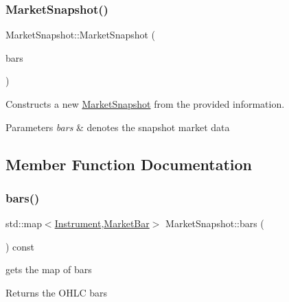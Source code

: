 \mbox{\label{classMarketSnapshot_a5e1530204818ffaea1e479d9371e77ae}} 
\subsubsection{\texorpdfstring{Market\+Snapshot()}{MarketSnapshot()}\hspace{0.1cm}{\footnotesize\ttfamily [2/2]}}
{\footnotesize\ttfamily Market\+Snapshot\+::\+Market\+Snapshot (\begin{DoxyParamCaption}\item[{const std\+::map$<$ \hyperlink{classInstrument}{Instrument}, \hyperlink{classMarketBar}{Market\+Bar} $>$ \&}]{bars }\end{DoxyParamCaption})}



Constructs a new \hyperlink{classMarketSnapshot}{Market\+Snapshot} from the provided information. 


\begin{DoxyParams}{Parameters}
{\em bars} & denotes the snapshot market data \\
\hline
\end{DoxyParams}


\subsection{Member Function Documentation}
\mbox{\label{classMarketSnapshot_ae8ab3cf282daf2c0001c583ead3b3250}} 
\subsubsection{\texorpdfstring{bars()}{bars()}}
{\footnotesize\ttfamily std\+::map$<$\hyperlink{classInstrument}{Instrument},\hyperlink{classMarketBar}{Market\+Bar}$>$ Market\+Snapshot\+::bars (\begin{DoxyParamCaption}{ }\end{DoxyParamCaption}) const}



gets the map of bars 

\begin{DoxyReturn}{Returns}
the O\+H\+LC bars 
\end{DoxyReturn}
\mbox{\label{classMarketSnapshot_ad8ad2cc84487f9b21d3db3604d2b1590}} 
